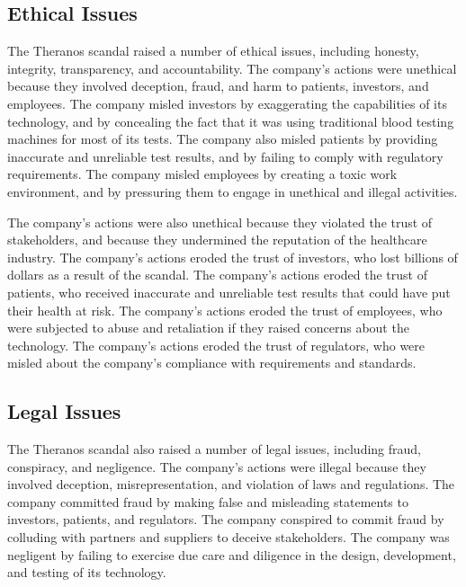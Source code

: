 \documentclass[stu]{apa7}
\begin{document}
\begin{multicols}{2}
    \subsection{Ethical Issues}

    The Theranos scandal raised a number of ethical issues, including honesty,
    integrity, transparency, and accountability. The company's actions were
    unethical because they involved deception, fraud, and harm to patients,
    investors, and employees. The company misled investors by exaggerating the
    capabilities of its technology, and by concealing the fact that it was using
    traditional blood testing machines for most of its tests. The company also
    misled patients by providing inaccurate and unreliable test results, and by
    failing to comply with regulatory requirements. The company misled employees
    by creating a toxic work environment, and by pressuring them to engage in
    unethical and illegal activities. \cite{wsj}

    The company's actions were also unethical because they violated the trust of
    stakeholders, and because they undermined the reputation of the healthcare
    industry. The company's actions eroded the trust of investors, who lost
    billions of dollars as a result of the scandal. The company's actions eroded
    the trust of patients, who received inaccurate and unreliable test results
    that could have put their health at risk. The company's actions eroded the
    trust of employees, who were subjected to abuse and retaliation if they
    raised concerns about the technology. The company's actions eroded the trust
    of regulators, who were misled about the company's compliance with
    requirements and standards. \cite{fortune}

    \subsection{Legal Issues}
    
    The Theranos scandal also raised a number of legal issues, including fraud,
    conspiracy, and negligence. The company's actions were illegal because they
    involved deception, misrepresentation, and violation of laws and regulations.
    The company committed fraud by making false and misleading statements to
    investors, patients, and regulators. The company conspired to commit fraud by
    colluding with partners and suppliers to deceive stakeholders. The company
    was negligent by failing to exercise due care and diligence in the design,
    development, and testing of its technology. \cite{nyt}


\end{multicols}
\end{document}
